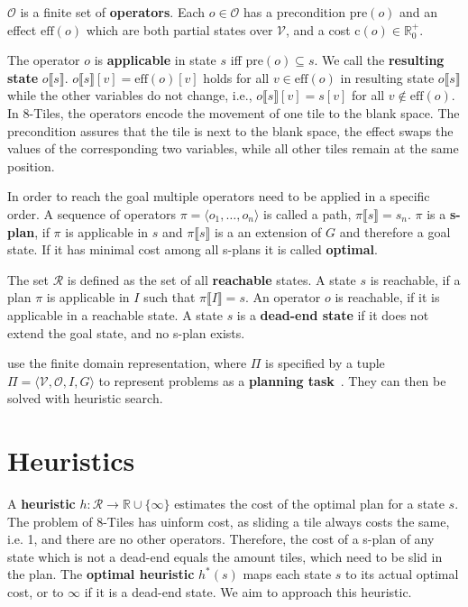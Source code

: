 $\mathcal{O}$ is a finite set of \textbf{operators}.
Each $o\in\mathcal{O}$ has a precondition $\text{pre}(o)$ and an effect $\text{eff}(o)$ which are both partial states over $\mathcal{V}$, and a cost $\text{c}(o)\in\mathbb{R}^+_0$.

The operator $o$ is \textbf{applicable} in state $s$ iff $\text{pre}(o)\subseteq s$.
We call the \textbf{resulting state} $o\llbracket s\rrbracket$.
$o\llbracket s\rrbracket[v] = \text{eff}(o)[v]$ holds for all $v\in \text{eff}(o)$ in resulting state $o\llbracket s\rrbracket$ while the other variables do not change, i.e., $o\llbracket s\rrbracket[v]=s[v]$ for all $v\notin \text{eff}(o)$.
In 8-Tiles, the operators encode the movement of one tile to the blank space.
The precondition assures that the tile is next to the blank space, the effect swaps the values of the corresponding two variables, while all other tiles remain at the same position.

In order to reach the goal multiple operators need to be applied in a specific order.
A sequence of operators $\pi=\langle o_1,\dots, o_n\rangle$ is called a path, $\pi\llbracket s\rrbracket = s_n$.
$\pi$ is a \textbf{s-plan}, if $\pi$ is applicable in $s$ and $\pi\llbracket s\rrbracket$ is a an extension of $G$ and therefore a goal state.
If it has minimal cost among all s-plans it is called \textbf{optimal}.

The set $\mathcal{R}$ is defined as the set of all \textbf{reachable} states.
A state $s$ is reachable, if a plan $\pi$ is applicable in $I$ such that $\pi\llbracket I\rrbracket = s$.
An operator $o$ is reachable, if it is applicable in a reachable state.
A state $s$ is a \textbf{dead-end state} if it does not extend the goal state, and no s-plan exists.

\citeauthor{fivser2020strengthening} use the finite domain representation, where $\Pi$ is specified by a tuple $ \Pi = \langle \mathcal{V}, \mathcal{O}, I, G \rangle$ to represent problems as a \textbf{planning task}~\cite{helmert2009concise}.
They can then be solved with heuristic search.

\section{Heuristics}\label{sec:heuristics}
A \textbf{heuristic} $h:\mathcal{R} \rightarrow \mathbb{R} \cup \{\infty\} $ estimates the cost of the optimal plan for a state $s$.
The problem of 8-Tiles has uinform cost, as sliding a tile always costs the same, i.e. 1, and there are no other operators.
Therefore, the cost of a s-plan of any state which is not a dead-end equals the amount tiles, which need to be slid in the plan.
The \textbf{optimal heuristic} $h^*(s)$ maps each state $s$  to its actual optimal cost, or to $\infty$ if it is a dead-end state.
We aim to approach this heuristic.

